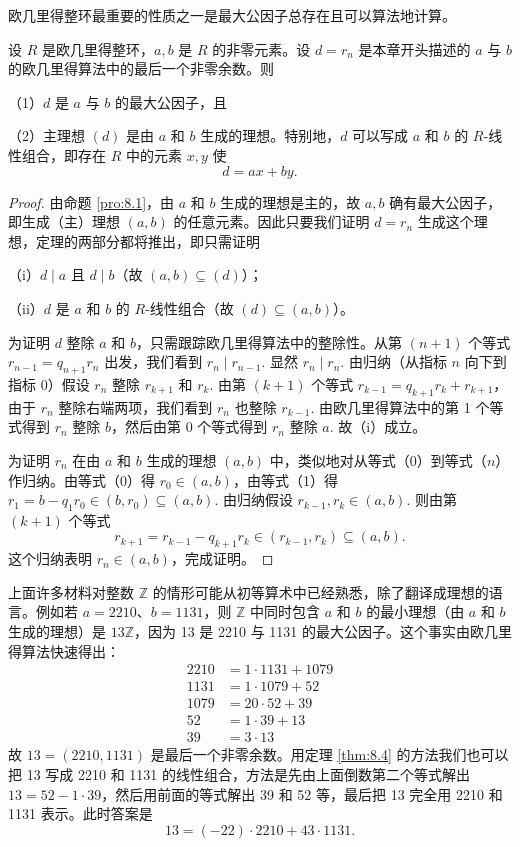 欧几里得整环最重要的性质之一是最大公因子总存在且可以算法地计算。

\begin{theorem}\label{thm:8.4}
设 \(R\) 是欧几里得整环，\(a, b\) 是 \(R\) 的非零元素。设 \(d = r_n\) 是本章开头描述的 \(a\) 与 \(b\) 的欧几里得算法中的最后一个非零余数。则

（1）\(d\) 是 \(a\) 与 \(b\) 的最大公因子，且

（2）主理想 \((d)\) 是由 \(a\) 和 \(b\) 生成的理想。特别地，\(d\) 可以写成 \(a\) 和 \(b\) 的 \(R\)-线性组合，即存在 \(R\) 中的元素 \(x, y\) 使
\[
d = ax + by.
\]
\end{theorem}

\begin{proof}
由命题 \ref{pro:8.1}，由 \(a\) 和 \(b\) 生成的理想是主的，故 \(a, b\) 确有最大公因子，即生成（主）理想 \((a, b)\) 的任意元素。因此只要我们证明 \(d = r_n\) 生成这个理想，定理的两部分都将推出，即只需证明

（i）\(d \mid a\) 且 \(d \mid b\)（故 \((a, b) \subseteq (d)\)）；

（ii）\(d\) 是 \(a\) 和 \(b\) 的 \(R\)-线性组合（故 \((d) \subseteq (a, b)\)）。

为证明 \(d\) 整除 \(a\) 和 \(b\)，只需跟踪欧几里得算法中的整除性。从第 \((n+1)\) 个等式 \(r_{n-1} = q_{n+1}r_n\) 出发，我们看到 \(r_n \mid r_{n-1}\). 显然 \(r_n \mid r_n\). 由归纳（从指标 \(n\) 向下到指标 0）假设 \(r_n\) 整除 \(r_{k+1}\) 和 \(r_k\). 由第 \((k+1)\) 个等式 \(r_{k-1} = q_{k+1}r_k + r_{k+1}\)，由于 \(r_n\) 整除右端两项，我们看到 \(r_n\) 也整除 \(r_{k-1}\). 由欧几里得算法中的第 1 个等式得到 \(r_n\) 整除 \(b\)，然后由第 0 个等式得到 \(r_n\) 整除 \(a\). 故（i）成立。

为证明 \(r_n\) 在由 \(a\) 和 \(b\) 生成的理想 \((a, b)\) 中，类似地对从等式（0）到等式（\(n\)）作归纳。由等式（0）得 \(r_0 \in (a, b)\)，由等式（1）得 \(r_1 = b - q_1r_0 \in (b, r_0) \subseteq (a, b)\). 由归纳假设 \(r_{k-1}, r_k \in (a, b)\). 则由第 \((k+1)\) 个等式
\[
r_{k+1} = r_{k-1} - q_{k+1}r_k \in (r_{k-1}, r_k) \subseteq (a, b).
\]
这个归纳表明 \(r_n \in (a, b)\)，完成证明。
\end{proof}

上面许多材料对整数 \(\mathbb{Z}\) 的情形可能从初等算术中已经熟悉，除了翻译成理想的语言。例如若 \(a = 2210\)、\(b = 1131\)，则 \(\mathbb{Z}\) 中同时包含 \(a\) 和 \(b\) 的最小理想（由 \(a\) 和 \(b\) 生成的理想）是 \(13\mathbb{Z}\)，因为 13 是 2210 与 1131 的最大公因子。这个事实由欧几里得算法快速得出：
\[
\begin{aligned}
2210 &= 1 \cdot 1131 + 1079\\
1131 &= 1 \cdot 1079 + 52\\
1079 &= 20 \cdot 52 + 39\\
52 &= 1 \cdot 39 + 13\\
39 &= 3 \cdot 13
\end{aligned}
\]
故 \(13 = (2210, 1131)\) 是最后一个非零余数。用定理 \ref{thm:8.4} 的方法我们也可以把 13 写成 2210 和 1131 的线性组合，方法是先由上面倒数第二个等式解出 \(13 = 52 - 1\cdot 39\)，然后用前面的等式解出 39 和 52 等，最后把 13 完全用 2210 和 1131 表示。此时答案是
\[
13 = (-22)\cdot 2210 + 43\cdot 1131.
\]

